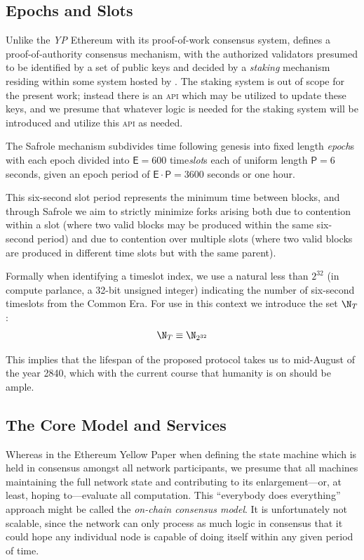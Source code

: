 \subsection{Epochs and Slots}\label{sec:epochsandslots}

Unlike the \emph{YP} Ethereum with its proof-of-work consensus system, \Jam defines a proof-of-authority consensus mechanism, with the authorized validators presumed to be identified by a set of public keys and decided by a \emph{staking} mechanism residing within some system hosted by \Jam. The staking system is out of scope for the present work; instead there is an \textsc{api} which may be utilized to update these keys, and we presume that whatever logic is needed for the staking system will be introduced and utilize this \textsc{api} as needed.

The Safrole mechanism subdivides time following genesis into fixed length \emph{epoch}s with each epoch divided into $\mathsf{E} = 600$ time\emph{slot}s each of uniform length $\mathsf{P} = 6$ seconds, given an epoch period of $\mathsf{E}\cdot\mathsf{P} = 3600$ seconds or one hour.

This six-second slot period represents the minimum time between \Jam blocks, and through Safrole we aim to strictly minimize forks arising both due to contention within a slot (where two valid blocks may be produced within the same six-second period) and due to contention over multiple slots (where two valid blocks are produced in different time slots but with the same parent).

Formally when identifying a timeslot index, we use a natural less than $2^{32}$ (in compute parlance, a 32-bit unsigned integer) indicating the number of six-second timeslots from the \Jam Common Era. For use in this context we introduce the set $\N_T$:
\begin{align}\label{eq:time}
  \N_T \equiv \N_{2^{32}}
\end{align}

This implies that the lifespan of the proposed protocol takes us to mid-August of the year 2840, which with the current course that humanity is on should be ample.

\subsection{The Core Model and Services}\label{sec:coremodelandservices}

Whereas in the Ethereum Yellow Paper when defining the state machine which is held in consensus amongst all network participants, we presume that all machines maintaining the full network state and contributing to its enlargement---or, at least, hoping to---evaluate all computation. This ``everybody does everything'' approach might be called the \emph{on-chain consensus model}. It is unfortunately not scalable, since the network can only process as much logic in consensus that it could hope any individual node is capable of doing itself within any given period of time.

